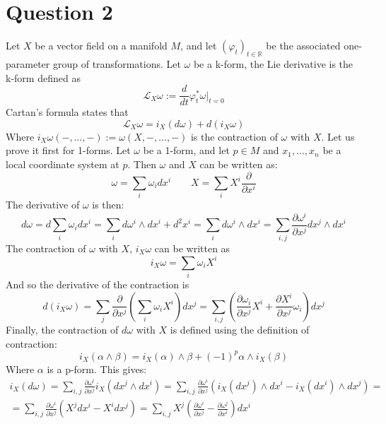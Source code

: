 \documentclass{article}
\newcommand{\R}{\ensuremath{\mathbb{R}}}
\begin{document}
\section*{Question 2}
Let $X$ be a vector field on a manifold $M$, and let $\left(\varphi_t\right)_{t\in\R}$ be the associated one-parameter group of transformations. Let $\omega$ be a k-form, the Lie derivative is the k-form defined as
\begin{equation}
    \mathcal{L}_X \omega := \frac{d}{dt} \varphi_t^* \omega |_{t = 0}
\end{equation}
Cartan's formula states that
\begin{equation}
\label{eq:cartans}
    \mathcal{L}_X \omega = i_X(d\omega) + d(i_X \omega)
\end{equation}
Where $i_X \omega(-,\dots,-) := \omega(X, -,\dots,-)$ is the contraction of $\omega$ with $X$. Let us prove it first for 1-forms. Let $\omega$ be a 1-form, and let $p \in M$ and $x_1, \dots, x_n$ be a local coordinate system at $p$. Then $\omega$ and $X$ can be written as:
\begin{equation}
    \omega = \sum_i \omega_i dx^i
    \qquad
    X = \sum_i X^i \frac{\partial}{\partial x^i}
\end{equation}
The derivative of $\omega$ is then:
\begin{equation}
    d\omega = d \sum_i \omega_i dx^i =
    \sum_i d\omega^i \wedge dx^i + d^2 x^i =
    \sum_i d\omega^i \wedge dx^i =
    \sum_{i,j}\frac{\partial \omega^i}{\partial x^j}dx^j \wedge dx^i
\end{equation}
The contraction of $\omega$ with $X$, $i_X \omega$ can be written as
\begin{equation}
    i_X \omega = \sum_i \omega_i X^i
\end{equation}
And so the derivative of the contraction is
\begin{equation}
    d(i_X \omega) = \sum_j \frac{\partial}{\partial x^j}\left(\sum_i \omega_i X^i\right) dx^j = \sum_{i,j}\left(\frac{\partial \omega_i}{\partial x^j}X^i + \frac{\partial X^i}{\partial x^j}\omega_i\right)dx^j
\end{equation}
Finally, the contraction of $d\omega$ with $X$ is defined using the definition of contraction:
\begin{equation}
    i_X(\alpha \wedge \beta) = i_X(\alpha)\wedge\beta + (-1)^p\alpha\wedge i_X(\beta)
\end{equation}
Where $\alpha$ is a p-form. This gives:
\begin{equation}
\begin{gathered}
    i_X(d\omega) = \sum_{i,j}\frac{\partial \omega^i}{\partial x^j}i_X \left(dx^j \wedge dx^i
    \right) = \sum_{i,j}\frac{\partial \omega^i}{\partial x^j}\left(i_X(dx^j) \wedge dx^i
    - i_X(dx^i) \wedge dx^j\right) = \\ =
    \sum_{i,j}\frac{\partial \omega^i}{\partial x^j}\left(X^j dx^i
    - X^i dx^j\right) =
    \sum_{i,j}X^j\left(\frac{\partial \omega^i}{\partial x^j}
    - \frac{\partial \omega^j}{\partial x^i} \right)dx^i
\end{gathered}
\end{equation}
\end{document}
